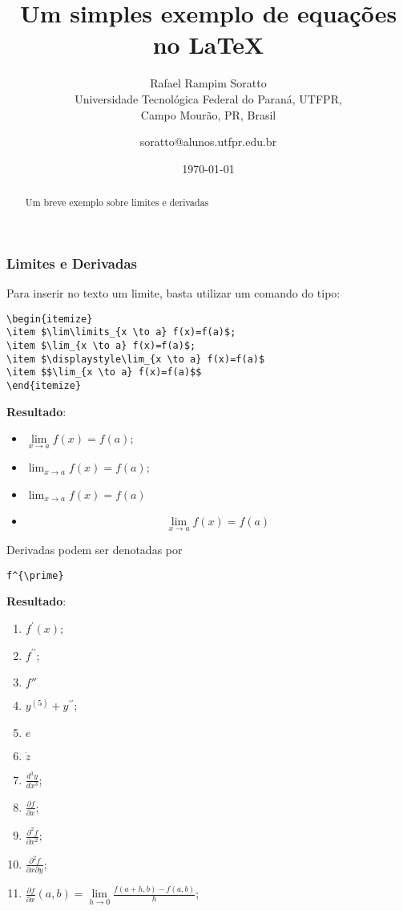 \documentclass{article}
\title{Um simples exemplo de equações no \LaTeX}
\author{Rafael Rampim Soratto  \\
	Universidade Tecnológica Federal do Paraná, UTFPR,\\ Campo Mourão, PR, Brasil \\
	\and 
	\small{soratto@alunos.utfpr.edu.br}
}
\date{\today}
\begin{document}
	
	\maketitle
	\begin{abstract}
		Um breve exemplo sobre limites e derivadas
	\end{abstract}
 
\subsubsection{Limites e Derivadas}     

Para inserir no texto um limite, basta utilizar um comando do tipo: 
\begin{lstlisting}
\begin{itemize}
\item $\lim\limits_{x \to a} f(x)=f(a)$;
\item $\lim_{x \to a} f(x)=f(a)$;
\item $\displaystyle\lim_{x \to a} f(x)=f(a)$
\item $$\lim_{x \to a} f(x)=f(a)$$
\end{itemize}
\end{lstlisting} 
\textbf{Resultado}: 

\begin{itemize}
	\item $\lim\limits_{x \to a} f(x)=f(a)$;
	\item $\lim_{x \to a} f(x)=f(a)$;
	\item $\displaystyle\lim_{x \to a} f(x)=f(a)$
	\item $$\lim_{x \to a} f(x)=f(a)$$
\end{itemize}

Derivadas podem ser denotadas por 
\begin{lstlisting}
f^{\prime}
\end{lstlisting}

\textbf{Resultado}: 

\begin{enumerate}
	\item $f^{\prime}(x)$;
	\item $f^{\prime\prime}$;
	\item $f''$
	\item $y^{(5)}+y^{\prime\prime}$;
	\item $e$
	\item $\dot{z}$
	\item $\frac{d^3y}{dx^3}$;
	\item $\frac{\partial f}{\partial x}$;
	\item $\frac{\partial^2 f}{\partial x^2}$;
	\item $\frac{\partial^2 f}{\partial x\partial y}$;
	\item $\frac{\partial f}{\partial x}(a,b)=\lim\limits_{h \to 0} \frac{f(a+h,b)-f(a,b)}{h}$;
\end{enumerate} 


	
\end{document}

